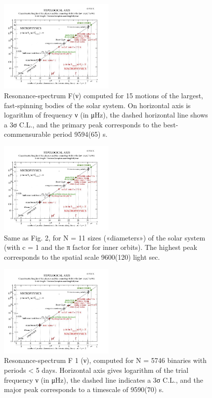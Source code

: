 \begin{figure}
\centering
\includegraphics[width=0.5\textwidth]{./figures/figure}
\caption{Resonance-spectrum F(ν) computed for 15 motions of the largest, fast-spinning bodies of
the solar system. On horizontal axis is logarithm of frequency ν (in μHz), the dashed horizontal line
shows a 3σ C.L., and the primary peak corresponds to the best-commensurable period 9594(65) s.}
\label{fig:figure_label}
\end{figure}

\begin{figure}
\centering
\includegraphics[width=0.5\textwidth]{./figures/figure}
\caption{Same as Fig. 2, for N = 11 sizes («diameters») of the solar system (with c = 1 and the π
factor for inner orbits). The highest peak corresponds to the spatial scale 9600(120) light sec.}
\label{fig:figure_label}
\end{figure}

\begin{figure}
\centering
\includegraphics[width=0.5\textwidth]{./figures/figure}
\caption{Resonance-spectrum F 1 (ν), computed for N = 5746 binaries with periods < 5 days.
Horizontal axis gives logarithm of the trial frequency ν (in μHz), the dashed line indicates a 3σ
C.L., and the major peak corresponds to a timescale of 9590(70) s.}
\label{fig:figure_label}
\end{figure}

